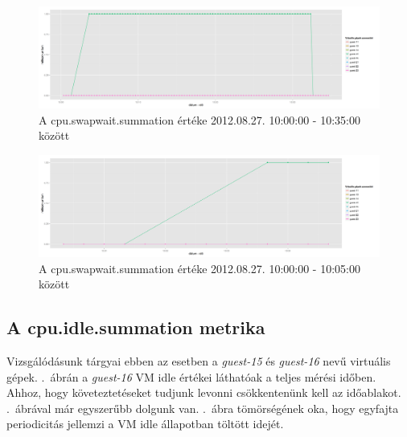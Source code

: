 \documentclass[a4paper,10pt,titlepage]{article}
\begin{document}
\begin{figure}[h!]
\centering
\includegraphics[width=1.00\textwidth]{figures/cpu_swapwait_summation-20120827100000-20120827103500.png}
\caption{A cpu.swapwait.summation értéke 2012.08.27. 10:00:00 - 10:35:00 között \label{fig:cpu_swapwait_summation_082701}}
\end{figure}

\begin{figure}[h!]
\centering
\includegraphics[width=1.00\textwidth]{figures/cpu_swapwait_summation-20120827100000-20120827100500.png}
\caption{A cpu.swapwait.summation értéke 2012.08.27. 10:00:00 - 10:05:00 között \label{fig:cpu_swapwait_summation_082702}}
\end{figure}

\subsection{A cpu.idle.summation metrika}

Vizsgálódásunk tárgyai ebben az esetben a \textit{guest-15} és \textit{guest-16} nevű virtuális gépek. .~ábrán a \textit{guest-16} VM idle értékei láthatóak a teljes mérési időben. Ahhoz, hogy követeztetéseket tudjunk levonni csökkentenünk kell az időablakot. .~ábrával már egyszerűbb dolgunk van. .~ábra tömörségének oka, hogy egyfajta periodicitás jellemzi a VM idle állapotban töltött idejét. 
\end{document}
